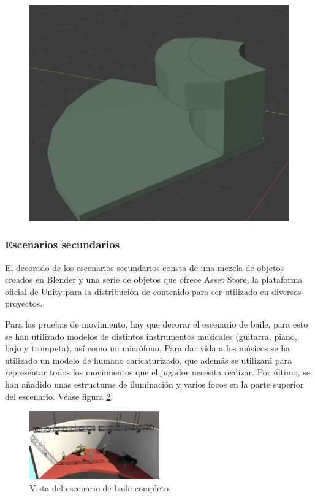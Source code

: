 \begin{figure}
\begin{minipage}{.3\textwidth}
  \includegraphics[width=.77\linewidth]{04.Desarrollo/03.Entrega3/02.Iteracion3_2/00.Figuras/06.ascensor_1.png}
  \label{fig:E3_ascensorMesaExtendida}
\end{minipage}
\end{figure}





\subsubsection{Escenarios secundarios}


El decorado de los escenarios secundarios consta de una mezcla de objetos creados en Blender y una serie de objetos que ofrece Asset Store, la plataforma oficial de Unity para la distribución de contenido para ser utilizado en diversos proyectos. 

Para las pruebas de movimiento, hay que decorar el escenario de baile, para esto se han utilizado modelos de distintos instrumentos musicales (guitarra, piano, bajo y trompeta), así como un micrófono. Para dar vida a los músicos se ha utilizado un modelo de humano caricaturizado, que además se utilizará para representar todos los movimientos que el jugador necesita realizar. Por último, se han añadido unas estructuras de iluminación y varios focos en la parte superior del escenario. Véase figura \ref{fig:E3_escenarioBaile}.

\begin{figure}
  \centering
    \includegraphics[width=0.5\textwidth]{04.Desarrollo/03.Entrega3/02.Iteracion3_2/00.Figuras/07.unity_1.png}
    \caption{Vista del escenario de baile completo.}
    \label{fig:E3_escenarioBaile}
\end{figure}

